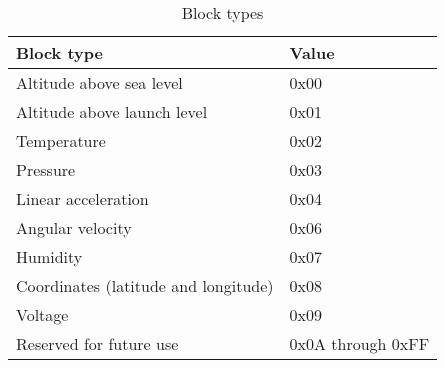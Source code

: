 \begin{table}[H]
    \centering
    \begin{tabular}{@{}ll@{}}
        \toprule
        Block type                           & Value             \\
        \midrule
        Altitude above sea level             & 0x00              \\
        Altitude above launch level          & 0x01              \\
        Temperature                          & 0x02              \\
        Pressure                             & 0x03              \\
        Linear acceleration                  & 0x04              \\
        Angular velocity                     & 0x06              \\
        Humidity                             & 0x07              \\
        Coordinates (latitude and longitude) & 0x08              \\
        Voltage                              & 0x09              \\
        Reserved for future use              & 0x0A through 0xFF \\
        \bottomrule
    \end{tabular}
    \caption{Block types}
    \label{table:block-types}
\end{table}
